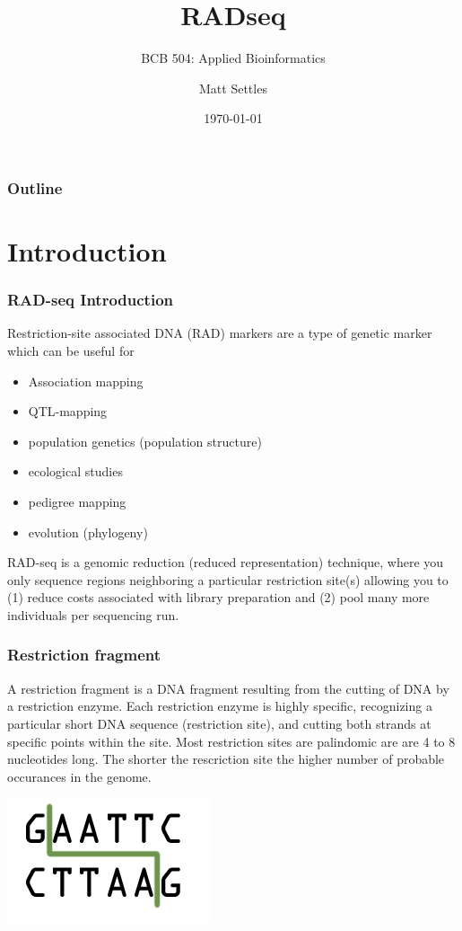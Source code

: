 \documentclass[pdf]{beamer}
\begin{document}
\title[Restriction-site Associated DNA tags (RADseq)]{RADseq}
\subtitle{BCB 504: Applied Bioinformatics\\}
\author[Matt Settles]{Matt Settles}
\date{\today}


\begin{frame}[plain]
  \titlepage
\end{frame}


\begin{frame}[plain] 
  \frametitle{Outline}
  \tableofcontents
\end{frame}

\section{Introduction}
\begin{frame}
  \frametitle{RAD-seq Introduction}
Restriction-site associated DNA (RAD) markers are a type of genetic marker which can be useful for
\begin{itemize}
\item Association mapping
\item QTL-mapping
\item population genetics (population structure)
\item ecological studies
\item pedigree mapping
\item evolution (phylogeny)
\end{itemize}
RAD-seq is a genomic reduction (reduced representation) technique, where you only sequence regions neighboring a particular restriction site(s) allowing you to (1) reduce costs associated with library preparation and (2) pool many more individuals per sequencing run.
\end{frame}

\begin{frame}
 \frametitle{Restriction fragment}
A restriction fragment is a DNA fragment resulting from the cutting of DNA by a restriction enzyme. Each restriction enzyme is highly specific, recognizing a particular short DNA sequence (restriction site), and cutting both strands at specific points within the site. Most restriction sites are palindomic are are 4 to 8 nucleotides long. The shorter the rescriction site the higher number of probable occurances in the genome.
\begin{center}
\includegraphics[scale=1.0]{Figures/Restriction_enzyme.jpg} 
\end{center}
\end{frame}
\end{document}
